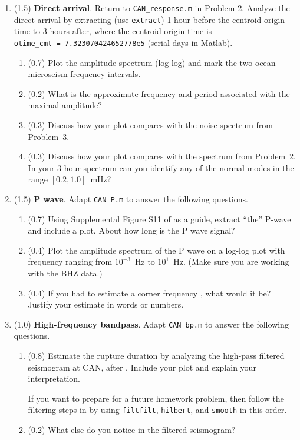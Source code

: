 \documentclass[11pt,titlepage,fleqn]{article}
\begin{document}
\begin{enumerate}
\item (1.5) {\bf Direct arrival}. 
Return to \verb+CAN_response.m+ in Problem 2.
Analyze the direct arrival by extracting (use \verb+extract+) 1 hour before the centroid origin time to 3 hours after, where the centroid origin time is \\ \verb+otime_cmt = 7.323070424652778e5+ (serial days in Matlab).

\begin{enumerate}
\item (0.7) Plot the amplitude spectrum (log-log) and mark the two ocean microseism frequency intervals.
\item (0.2) What is the approximate frequency and period associated with the maximal amplitude?
\item (0.3) Discuss how your plot compares with the noise spectrum from Problem~3.
\item (0.3) Discuss how your plot compares with the spectrum from Problem~2. \\
In your 3-hour spectrum can you identify any of the normal modes in the range $[0.2,1.0]$~mHz?
\end{enumerate}


\item (1.5) {\bf P wave}. Adapt \verb+CAN_P.m+ to answer the following questions.
%
\begin{enumerate}
\item (0.7) Using Supplemental Figure S11 of \citet{Ammon2005} as a guide, extract ``the'' P-wave and include a plot. About how long is the P wave signal?
\item (0.4) Plot the amplitude spectrum of the P wave on a log-log plot with frequency ranging from $10^{-3}$~Hz to $10^1$~Hz. (Make sure you are working with the BHZ data.)

\item (0.4) If you had to estimate a corner frequency \citep[][p.~267]{SteinWysession}, what would it be? Justify your estimate in words or numbers.
\end{enumerate}


\item (1.0) {\bf High-frequency bandpass}. Adapt \verb+CAN_bp.m+ to answer the following questions.
%
\begin{enumerate}
\item (0.8) Estimate the rupture duration by analyzing the high-pass filtered seismogram at CAN, after \citet{Ni2005}. Include your plot and explain your interpretation.

If you want to prepare for a future homework problem, then follow the filtering steps in \citet{Ni2005} by using \verb+filtfilt+, \verb+hilbert+, and \verb+smooth+ in this order.

\item (0.2) What else do you notice in the filtered seismogram?
\end{enumerate}

\end{enumerate}
\end{document}
